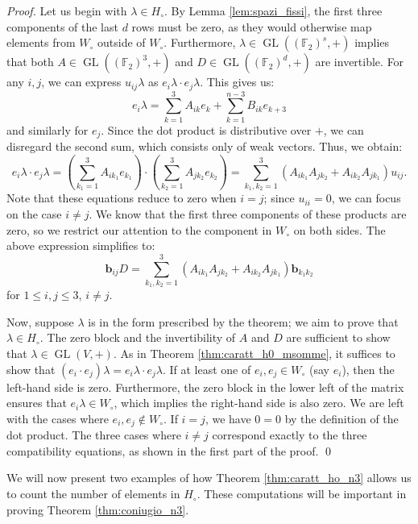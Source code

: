 \documentclass[runningheads,a4paper,english]{llncs}
\newcommand{\F}{\mathbb{F}}
\newcommand{\lb}{\lambda}
\DeclareMathOperator{\gl}{GL}
\DeclareMathOperator{\GL}{GL}
\renewcommand{\b}{\textbf{b}}
\newcommand{\wo}{W_\circ}
\newcommand{\ho}{H_\circ}
\newcommand{\Sum}{\sum\limits}
\begin{document}
\begin{proof}

Let us begin with $\lb \in \ho$. By Lemma \ref{lem:spazi_fissi}, the first three components of the last $d$ rows must be zero, as they would otherwise map elements from $\wo$ outside of $\wo$. Furthermore, $\lb \in \gl((\F_2)^s, +)$ implies that both $A \in \GL((\F_2)^3, +)$ and $D \in \GL((\F_2)^d, +)$ are invertible. For any $i, j$, we can express $u_{ij} \lb$ as $e_i \lb \cdot e_j\lb$. This gives us:
\[
e_i \lb = \Sum_{k=1}^3 A_{ik} e_k + \Sum_{k=1}^{n-3} B_{ik} e_{k+3}
\]
and similarly for $e_j$. Since the dot product is distributive over $+$, we can disregard the second sum, which consists only of weak vectors. Thus, we obtain:
\[
e_i \lb \cdot e_j \lb = \left(\Sum_{k_1=1}^3 A_{ik_1} e_{k_1}\right) \cdot \left(\Sum_{k_2=1}^3 A_{jk_2} e_{k_2}\right) = \Sum_{k_1, k_2=1}^3 \left( A_{ik_1}A_{jk_2} + A_{ik_2}A_{jk_1} \right) u_{ij}.
\]
Note that these equations reduce to zero when $i = j$; since $u_{ii} = 0$, we can focus on the case $i \neq j$. We know that the first three components of these products are zero, so we restrict our attention to the component in $\wo$ on both sides. The above expression simplifies to:
\[
\b_{ij}D = \Sum_{k_1, k_2=1}^3 (A_{ik_1} A_{jk_2} + A_{ik_2} A_{jk_1}) \b_{k_1 k_2}
\]
for $1 \leq i,j \leq 3$, $i \neq j$.

Now, suppose $\lb$ is in the form prescribed by the theorem; we aim to prove that $\lb \in \ho$. The zero block and the invertibility of $A$ and $D$ are sufficient to show that $\lb \in \gl(V, +)$. As in Theorem \ref{thm:caratt_h0_msomme}, it suffices to show that $(e_i \cdot e_j) \lb = e_i \lb \cdot e_j \lb$. If at least one of $e_i, e_j \in \wo$ (say $e_i$), then the left-hand side is zero. Furthermore, the zero block in the lower left of the matrix ensures that $e_i \lb \in \wo$, which implies the right-hand side is also zero. We are left with the cases where $e_i, e_j \not\in \wo$. If $i = j$, we have $0 = 0$ by the definition of the dot product. The three cases where $i \neq j$ correspond exactly to the three compatibility equations, as shown in the first part of the proof. \qed
\end{proof}

We will now present two examples of how Theorem \ref{thm:caratt_ho_n3} allows us to count the number of elements in $\ho$. These computations will be important in proving Theorem \ref{thm:coniugio_n3}.
\end{document}
